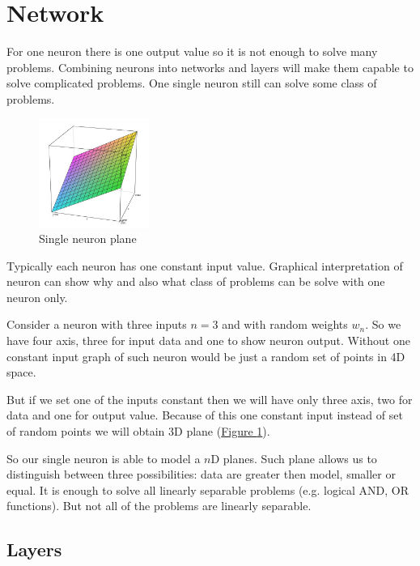 \section{Network}

For one neuron there is one output value so it is not enough to solve many problems. Combining neurons into networks and layers will make them capable to solve complicated problems. One single neuron still can solve some class of problems.

\begin{figure}
    \includegraphics[width=0.32\textwidth]{Media/Plane.png}
    \caption{Single neuron plane}
    \label{fig:SingleNeuronPlane}
\end{figure}

Typically each neuron has one constant input value. Graphical interpretation of neuron can show why and also what class of problems can be solve with one neuron only.

Consider a neuron with three inputs $n = 3$ and with random weights $w_n$. So we have four axis, three for input data and one to show neuron output. Without one constant input graph of such neuron would be just a random set of points in 4D space.

But if we set one of the inputs constant then we will have only three axis, two for data and one for output value. Because of this one constant input instead of set of random points we will obtain 3D plane (\hyperref[fig:SingleNeuronPlane]{Figure \ref{fig:SingleNeuronPlane}}).

So our single neuron is able to model a $n$D planes. Such plane allows us to distinguish between three possibilities: data are greater then model, smaller or equal. It is enough to solve all linearly separable problems (e.g. logical AND, OR functions). But not all of the problems are linearly separable.


\subsection{Layers}


